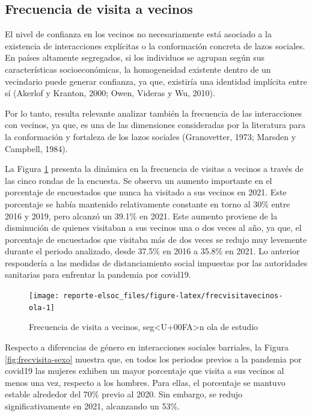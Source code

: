 \documentclass[
  12pt,
]{book}
\begin{document}
\hypertarget{frecuencia-de-visita-a-vecinos}{%
\subsection*{Frecuencia de visita a vecinos}\label{frecuencia-de-visita-a-vecinos}}

El nivel de confianza en los vecinos no necesariamente está asociado a la existencia de interacciones explícitas o la conformación concreta de lazos sociales. En países altamente segregados, si los individuos se agrupan según sus características socioeconómicas, la homogeneidad existente dentro de un vecindario puede generar confianza, ya que, existiría una identidad implícita entre sí (Akerlof y Kranton, 2000; Owen, Videras y Wu, 2010).

Por lo tanto, resulta relevante analizar también la frecuencia de las interacciones con vecinos, ya que, es una de las dimensiones consideradas por la literatura para la conformación y fortaleza de los lazos sociales (Granovetter, 1973; Marsden y Campbell, 1984).

La Figura \ref{fig:frecvisitavecinos-ola} presenta la dinámica en la frecuencia de visitas a vecinos a través de las cinco rondas de la encuesta. Se observa un aumento importante en el porcentaje de encuestados que nunca ha visitado a sus vecinos en 2021. Este porcentaje se había mantenido relativamente constante en torno al 30\% entre 2016 y 2019, pero alcanzó un 39.1\% en 2021. Este aumento proviene de la disminución de quienes visitaban a sus vecinos una o dos veces al año, ya que, el porcentaje de encuestados que visitaba más de dos veces se redujo muy levemente durante el periodo analizado, desde 37.5\% en 2016 a 35.8\% en 2021. Lo anterior respondería a las medidas de distanciamiento social impuestas por las autoridades sanitarias para enfrentar la pandemia por covid19.

\begin{figure}

{\centering \texttt{[image: reporte-elsoc\_files/figure-latex/frecvisitavecinos-ola-1]} 

}

\caption{Frecuencia de visita a vecinos, seg<U+00FA>n ola de estudio}\label{fig:frecvisitavecinos-ola}
\end{figure}

Respecto a diferencias de género en interacciones sociales barriales, la Figura \ref{fig:frecvisita-sexo} muestra que, en todos los periodos previos a la pandemia por covid19 las mujeres exhiben un mayor porcentaje que visita a sus vecinos al menos una vez, respecto a los hombres. Para ellas, el porcentaje se mantuvo estable alrededor del 70\% previo al 2020. Sin embargo, se redujo significativamente en 2021, alcanzando un 53\%.
\end{document}
